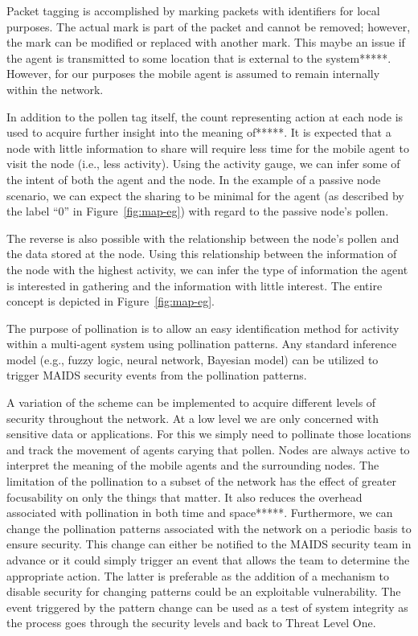 \documentclass{acm_proc_article-sp}
\begin{document}
Packet tagging is accomplished by marking packets with identifiers for local purposes.  The actual mark is part of the packet and cannot be removed; however, the mark can be modified or replaced with another mark.  This maybe an issue if the agent is transmitted to some location that is external to the system*****.  However, for our purposes the mobile agent is assumed to remain internally within the network.

In addition to the pollen tag itself, the count representing action at each node is used to acquire further insight into the meaning of*****.  It is expected that a node with little information to share will require less time for the mobile agent to visit the node (i.e., less activity).  Using the activity gauge, we can infer some of the intent of both the agent and the node.  In the example of a passive node scenario, we can expect the sharing to be minimal for the agent (as described by the label ``0'' in Figure~\ref{fig:map-eg}) with regard to the passive node's pollen.

The reverse is also possible with the relationship between the node's pollen and the data stored at the node.  Using this relationship between the information of the node with the highest activity, we can infer the type of information the agent is interested in gathering and the information with little interest.  The entire concept is depicted in Figure~\ref{fig:map-eg}.

The purpose of pollination is to allow an easy identification method for activity within a multi-agent system using pollination patterns.  Any standard inference model (e.g., fuzzy logic, neural network, Bayesian model) can be utilized to trigger MAIDS security events from the pollination patterns.

A variation of the scheme can be implemented to acquire different levels of security throughout the network.  At a low level we are only concerned with sensitive data or applications.  For this we simply need to pollinate those locations and track the movement of agents carying that pollen.  Nodes are always active to interpret the meaning of the mobile agents and the surrounding nodes.  The limitation of the pollination to a subset of the network has the effect of greater focusability on only the things that matter.  It also reduces the overhead associated with pollination in both time and space*****.  Furthermore, we can change the pollination patterns associated with the network on a periodic basis to ensure security.  This change can either be notified to the MAIDS security team in advance or it could simply trigger an event that allows the team to determine the appropriate action.  The latter is preferable as the addition of a mechanism to disable security for changing patterns could be an exploitable vulnerability.  The event triggered by the pattern change can be used as a test of system integrity as the process goes through the security levels and back to Threat Level One.
\end{document}
